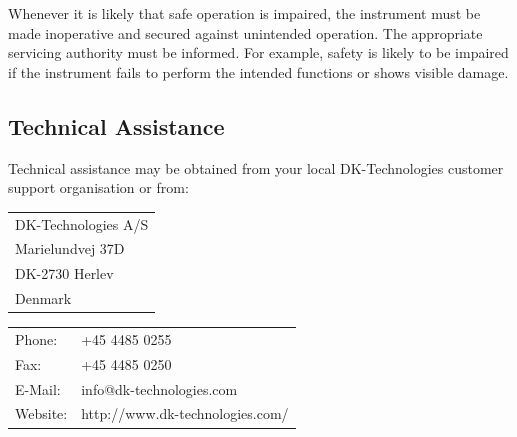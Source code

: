 Whenever it is likely that safe operation is impaired, the instrument must be made inoperative and secured against unintended operation. The appropriate servicing authority must be informed. For example, safety is likely to be impaired if the instrument fails to perform the intended functions or shows visible damage.

\begin{center}
\end{center}

\subsection{Technical Assistance}
Technical assistance may be obtained from your local DK-Technologies customer support organisation or from:

\begin{tabular}{@{}l}
{\large DK-Technologies A/S }\\
Marielundvej 37D\\
DK-2730 Herlev\\
Denmark\\
\end{tabular}

\begin{tabular}{@{}l l}
Phone: & +45 4485 0255\\
Fax: & +45 4485 0250\\
E-Mail: & info@dk-technologies.com\\
Website: & http://www.dk-technologies.com/\\
\end{tabular}